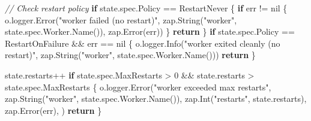 \documentclass[
]{article}
\newenvironment{Shaded}{}{}
\newcommand{\CommentTok}[1]{\textcolor[rgb]{0.38,0.63,0.69}{\textit{#1}}}
\newcommand{\ControlFlowTok}[1]{\textcolor[rgb]{0.00,0.44,0.13}{\textbf{#1}}}
\newcommand{\DecValTok}[1]{\textcolor[rgb]{0.25,0.63,0.44}{#1}}
\newcommand{\NormalTok}[1]{#1}
\newcommand{\OperatorTok}[1]{\textcolor[rgb]{0.40,0.40,0.40}{#1}}
\newcommand{\OtherTok}[1]{\textcolor[rgb]{0.00,0.44,0.13}{#1}}
\newcommand{\StringTok}[1]{\textcolor[rgb]{0.25,0.44,0.63}{#1}}
\begin{document}
\begin{Shaded}
\begin{Highlighting}[]
        \CommentTok{// Check restart policy}
        \ControlFlowTok{if}\NormalTok{ state}\OperatorTok{.}\NormalTok{spec}\OperatorTok{.}\NormalTok{Policy }\OperatorTok{==}\NormalTok{ RestartNever }\OperatorTok{\{}
            \ControlFlowTok{if}\NormalTok{ err }\OperatorTok{!=} \OtherTok{nil} \OperatorTok{\{}
\NormalTok{                o}\OperatorTok{.}\NormalTok{logger}\OperatorTok{.}\NormalTok{Error}\OperatorTok{(}\StringTok{"worker failed (no restart)"}\OperatorTok{,}\NormalTok{ zap}\OperatorTok{.}\NormalTok{String}\OperatorTok{(}\StringTok{"worker"}\OperatorTok{,}\NormalTok{ state}\OperatorTok{.}\NormalTok{spec}\OperatorTok{.}\NormalTok{Worker}\OperatorTok{.}\NormalTok{Name}\OperatorTok{()),}\NormalTok{ zap}\OperatorTok{.}\NormalTok{Error}\OperatorTok{(}\NormalTok{err}\OperatorTok{))}
            \OperatorTok{\}}
            \ControlFlowTok{return}
        \OperatorTok{\}}
        \ControlFlowTok{if}\NormalTok{ state}\OperatorTok{.}\NormalTok{spec}\OperatorTok{.}\NormalTok{Policy }\OperatorTok{==}\NormalTok{ RestartOnFailure }\OperatorTok{\&\&}\NormalTok{ err }\OperatorTok{==} \OtherTok{nil} \OperatorTok{\{}
\NormalTok{            o}\OperatorTok{.}\NormalTok{logger}\OperatorTok{.}\NormalTok{Info}\OperatorTok{(}\StringTok{"worker exited cleanly (no restart)"}\OperatorTok{,}\NormalTok{ zap}\OperatorTok{.}\NormalTok{String}\OperatorTok{(}\StringTok{"worker"}\OperatorTok{,}\NormalTok{ state}\OperatorTok{.}\NormalTok{spec}\OperatorTok{.}\NormalTok{Worker}\OperatorTok{.}\NormalTok{Name}\OperatorTok{()))}
            \ControlFlowTok{return}
        \OperatorTok{\}}

\NormalTok{        state}\OperatorTok{.}\NormalTok{restarts}\OperatorTok{++}
        \ControlFlowTok{if}\NormalTok{ state}\OperatorTok{.}\NormalTok{spec}\OperatorTok{.}\NormalTok{MaxRestarts }\OperatorTok{\textgreater{}} \DecValTok{0} \OperatorTok{\&\&}\NormalTok{ state}\OperatorTok{.}\NormalTok{restarts }\OperatorTok{\textgreater{}}\NormalTok{ state}\OperatorTok{.}\NormalTok{spec}\OperatorTok{.}\NormalTok{MaxRestarts }\OperatorTok{\{}
\NormalTok{            o}\OperatorTok{.}\NormalTok{logger}\OperatorTok{.}\NormalTok{Error}\OperatorTok{(}\StringTok{"worker exceeded max restarts"}\OperatorTok{,}
\NormalTok{                zap}\OperatorTok{.}\NormalTok{String}\OperatorTok{(}\StringTok{"worker"}\OperatorTok{,}\NormalTok{ state}\OperatorTok{.}\NormalTok{spec}\OperatorTok{.}\NormalTok{Worker}\OperatorTok{.}\NormalTok{Name}\OperatorTok{()),}
\NormalTok{                zap}\OperatorTok{.}\NormalTok{Int}\OperatorTok{(}\StringTok{"restarts"}\OperatorTok{,}\NormalTok{ state}\OperatorTok{.}\NormalTok{restarts}\OperatorTok{),}
\NormalTok{                zap}\OperatorTok{.}\NormalTok{Error}\OperatorTok{(}\NormalTok{err}\OperatorTok{),}
            \OperatorTok{)}
            \ControlFlowTok{return}
        \OperatorTok{\}}


\end{Highlighting}
\end{Shaded}
\end{document}
